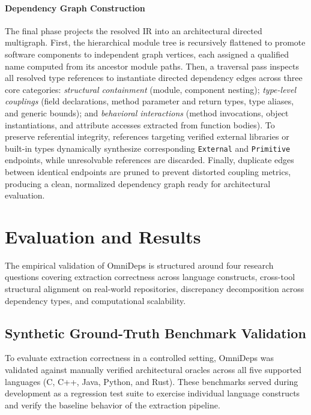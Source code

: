 \documentclass[a4paper, 11pt]{article}
\begin{document}
\paragraph{Dependency Graph Construction}
The final phase projects the resolved IR into an architectural directed
multigraph.
First, the hierarchical module tree is recursively flattened to promote
software components to independent graph vertices, each assigned a
qualified name computed from its ancestor module paths.
Then, a traversal pass inspects all resolved type references to
instantiate directed dependency edges across three core categories:
\textit{structural containment} (module, component
nesting);
\textit{type-level couplings} (field declarations, method parameter and
return types, type aliases, and generic bounds); and
\textit{behavioral interactions} (method invocations, object
instantiations, and attribute accesses extracted from function bodies).
To preserve referential integrity, references targeting verified external
libraries or built-in types dynamically synthesize corresponding
\texttt{External} and \texttt{Primitive} endpoints, while unresolvable
references are discarded.
Finally, duplicate edges between identical endpoints are pruned to
prevent distorted coupling metrics, producing a clean, normalized
dependency graph ready for architectural evaluation.

\section{Evaluation and Results}
\label{sec:results}

The empirical validation of OmniDeps is structured around four research
questions covering extraction correctness across language constructs,
cross-tool structural alignment on real-world repositories, discrepancy
decomposition across dependency types, and computational scalability.

\subsection{Synthetic Ground-Truth Benchmark Validation}
To evaluate extraction correctness in a controlled setting, OmniDeps
was validated against manually verified architectural
oracles across all five supported languages (C, C++, Java, Python,
and Rust). These benchmarks served during development as a regression
test suite to exercise individual language constructs and verify the
baseline behavior of the extraction pipeline.
\end{document}
